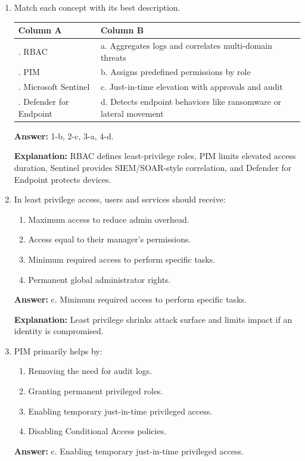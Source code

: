 \documentclass[10pt]{article}
\begin{document}
\begin{enumerate}[leftmargin=*]
\item Match each concept with its best description.

\begin{center}
\begin{tabular}{>{\raggedright\arraybackslash}p{} >{\raggedright\arraybackslash}p{}}
\toprule
\textbf{Column A} & \textbf{Column B} \\
\midrule
1. RBAC & a. Aggregates logs and correlates multi-domain threats \\
2. PIM & b. Assigns predefined permissions by role \\
3. Microsoft Sentinel & c. Just-in-time elevation with approvals and audit \\
4. Defender for Endpoint & d. Detects endpoint behaviors like ransomware or lateral movement \\
\bottomrule
\end{tabular}
\end{center}

\textbf{Answer:} 1-b, 2-c, 3-a, 4-d.

\textbf{Explanation:} RBAC defines least-privilege roles, PIM limits elevated access duration, Sentinel provides SIEM/SOAR-style correlation, and Defender for Endpoint protects devices.

\item In least privilege access, users and services should receive:
\begin{enumerate}[label=\alph*., leftmargin=1.5em]
\item Maximum access to reduce admin overhead.
\item Access equal to their manager's permissions.
\item Minimum required access to perform specific tasks.
\item Permanent global administrator rights.
\end{enumerate}
\textbf{Answer:} c. Minimum required access to perform specific tasks.

\textbf{Explanation:} Least privilege shrinks attack surface and limits impact if an identity is compromised.

\item PIM primarily helps by:
\begin{enumerate}[label=\alph*., leftmargin=1.5em]
\item Removing the need for audit logs.
\item Granting permanent privileged roles.
\item Enabling temporary just-in-time privileged access.
\item Disabling Conditional Access policies.
\end{enumerate}
\textbf{Answer:} c. Enabling temporary just-in-time privileged access.


\end{enumerate}
\end{document}
